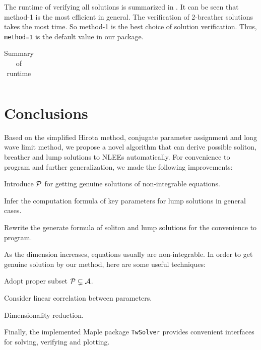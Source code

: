 The runtime of verifying all solutions is summarized in . It can be seen that method-1 is the most efficient in general. The verification of 2-breather solutions takes the most time. So method-1 is the best choice of solution verification. Thus, \texttt{method=1} is the default value in our package. 

\begin{table}[htbp]
\centering 
\caption{Summary of runtime} \label{runtime}
\begin{tabular}{c|ccc|c}
\hline

\hline
\end{tabular}
\end{table}

\section{Conclusions}\label{Conclusions-01}
Based on the simplified Hirota method, conjugate parameter assignment and long wave limit method, we propose a novel algorithm that can derive possible soliton, breather and lump solutions to NLEEs automatically. For convenience to program and further generalization, we made the following improvements:
\begin{compactitem}[\textbullet]
\item Introduce $\mathcal{P}$ for getting genuine solutions of non-integrable equations.
\item Infer the computation formula of key parameters for lump solutions in general cases.
\item Rewrite the generate formula of soliton and lump solutions for the convenience to program. 
\end{compactitem}

As the dimension increases, equations usually are non-integrable. In order to get genuine solution by our method, here are some useful techniques:
\begin{compactitem}[\textbullet]
\item Adopt proper subset $\mathcal{P}\subsetneq  \mathcal{A}$. 
\item Consider linear correlation between parameters.
\item Dimensionality reduction.
\end{compactitem}

Finally, the implemented Maple package \texttt{TwSolver} provides convenient interfaces for solving, verifying and plotting.
